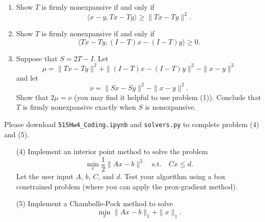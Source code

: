 \documentclass[11pt]{amsart}
\begin{document}
\begin{enumerate}
\begin{enumerate}
\item Show $T$ is firmly nonexpansive if and only if 
\[
\langle x-y, Tx - Ty \rangle \geq \|Tx - Ty\|^2. 
\]
\item Show $T$ is firmly nonexpansive if and only if 
\[
\langle Tx - Ty, (I-T)x - (I-T)y \rangle \geq 0. 
\]


\item Suppose that $S = 2T - I$. Let 
\[
\mu = \|Tx - Ty\|^2 + \|(I-T)x - (I-T)y\|^2 - \|x-y\|^2
\]
and let 
\[
\nu = \|Sx - Sy\|^2 - \|x-y\|^2.
\]
Show that $2\mu = \nu$ (you may find it helpful to use problem (1)). Conclude that 
$T$ is firmly nonexpansive exactly when $S$ is nonexpansive. 

\end{enumerate}

\end{enumerate}
\newpage
{}
\vskip 8pt \noindent
Please download \texttt{515Hw4\_Coding.ipynb} and \texttt{solvers.py} to complete problem (4) and (5).
\vskip 8pt

\begin{enumerate}

\item[(4)] Implement an interior point method to solve the problem 
\[
\min_x \frac{1}{2}\|Ax-b\|^2 \quad \mbox{s.t.} \quad Cx \leq d. 
\]
Let the user input $A$, $b$, $C$, and $d$. Test your algorithm using a box constrained problem 
(where you can apply the prox-gradient method). 

\bigskip\bigskip\bigskip






\bigskip\bigskip\bigskip



\item[(5)] Implement a Chambolle-Pock method to solve  
\[
\min_{x} \|Ax-b\|_1 + \|x\|_1. 
\]





\end{enumerate}
\end{document}
